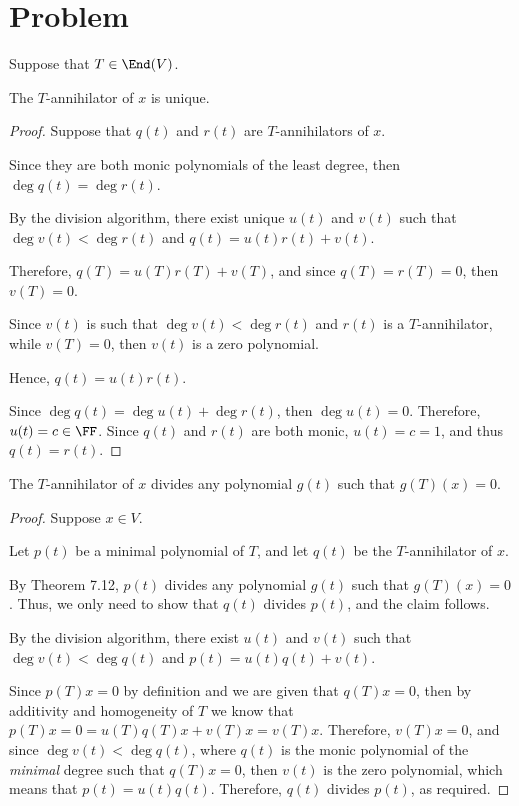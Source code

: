 \documentclass[11pt]{scrartcl}
\begin{document}
\section{Problem}

Suppose that $T \in \End(V)$.

\begin{lemma}
\label{sec:problem}
The $T$-annihilator of $x$ is unique.
\end{lemma}

\begin{proof}
  \hfill

  Suppose that $q(t)$ and $r(t)$ are $T$-annihilators of $x$.

  Since they are both monic polynomials of the least degree, then
  $\deg q(t) = \deg r(t)$.

  By the division algorithm, there exist unique $u(t)$ and $v(t)$ such
  that $\deg v(t) < \deg r(t)$ and $q(t) = u(t)r(t)+v(t)$.

  Therefore, $q(T) = u(T)r(T)+v(T)$, and since $q(T) = r(T) = 0$, then
  $v(T) = 0$.

  Since $v(t)$ is such that $\deg v(t) < \deg r(t)$ and $r(t)$ is a
  $T$-annihilator, while $v(T) = 0$, then $v(t)$ is a zero polynomial.

  Hence, $q(t) = u(t)r(t)$. 

  Since $\deg q(t) = \deg u(t)+\deg r(t)$, then $\deg u(t) =
  0$. Therefore, $u(t) = c\in \FF$. Since $q(t)$ and $r(t)$ are both
  monic, $u(t) = c = 1$, and thus $q(t) = r(t)$.
\end{proof}

\begin{theorem}
\label{sec:problem-1}
The $T$-annihilator of $x$ divides any polynomial $g(t)$ such that $g(T)(x) = 0$.
\end{theorem}

\begin{proof}
  \hfill

  Suppose $x\in V$.

  Let $p(t)$ be a minimal polynomial of $T$, and let $q(t)$ be the
  $T$-annihilator of $x$.

  By Theorem 7.12, $p(t)$ divides any polynomial $g(t)$ such that
  $g(T)(x) = 0$. Thus, we only need to show that $q(t)$ divides
  $p(t)$, and the claim follows.

  By the division algorithm, there exist $u(t)$ and $v(t)$ such that
  $\deg v(t) < \deg q(t)$ and $p(t) = u(t)q(t)+v(t)$. 

  Since $p(T)x=0$ by definition and we are given that $q(T)x = 0$,
  then by additivity and homogeneity of $T$ we know that
  $p(T)x = 0 = u(T)q(T)x +v(T)x = v(T)x$. Therefore, $v(T)x = 0$, and
  since $\deg v(t) < \deg q(t)$, where $q(t)$ is the monic polynomial
  of the \textit{minimal} degree such that $q(T)x = 0$, then $v(t)$ is
  the zero polynomial, which means that $p(t) = u(t)q(t)$. Therefore,
  $q(t)$ divides $p(t)$, as required.


\end{proof}
\end{document}
